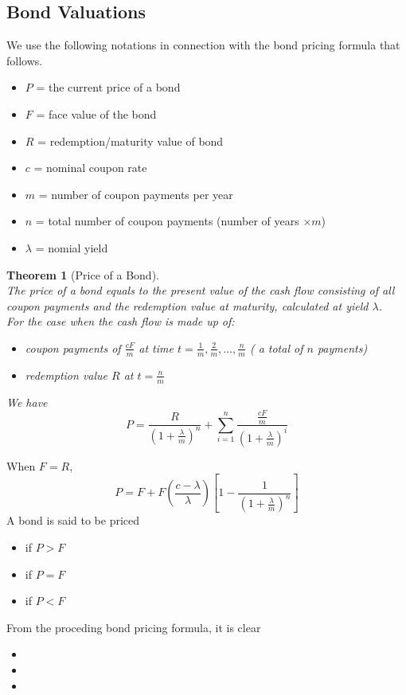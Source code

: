 \documentclass[11pt]{article}
\newtheorem{theorem}{Theorem}[section]
\theoremstyle{definition}
\begin{document}
\subsection{Bond Valuations}
We use the following notations in connection with the bond pricing formula that follows.
\begin{itemize}
  \item $P$ = the current price of a bond
  \item $F$ = face value of the bond
  \item $R$ = redemption/maturity value of bond
  \item $c$ = nominal coupon rate
  \item $m$ = number of coupon payments per year
  \item $n$ = total number of coupon payments (number of years $\times m$)
  \item $\lambda$ = nomial yield
\end{itemize}
\begin{theorem}[Price of a Bond]
\hfill\\\normalfont
The price of a bond equals to the present value of the cash flow consisting of all coupon payments and the redemption value at maturity, calculated at yield $\lambda$.\\
For the case when the cash flow is made up of:
\begin{itemize}
  \item coupon payments of $\frac{cF}{m}$ at time $t=\frac{1}{m},\frac{2}{m},\ldots, \frac{n}{m}$ ( a total of $n$ payments)
  \item redemption value $R$ at $t = \frac{n}{m}$
\end{itemize}
We have
\[
P=\frac{R}{\left(1+\frac{\lambda}{m}\right)^n}+\sum_{i=1}^n\frac{\frac{cF}{m}}{\left(1+\frac{\lambda}{m}\right)^i}
\]
\end{theorem}
When $F=R$,
\[
P = F+F\left(\frac{c-\lambda}{\lambda}\right)\left[1-\frac{1}{\left(1+\frac{\lambda}{m}\right)^n}\right]
\]
A bond is said to be priced
\begin{itemize}
  \item{ if $P>F$}
  \item{ if $P=F$}
  \item{ if $P<F$}
\end{itemize}
From the proceding bond pricing formula, it is clear
\begin{itemize}
  \item {}
  \item {}
  \item {}
\end{itemize}
\end{document}
